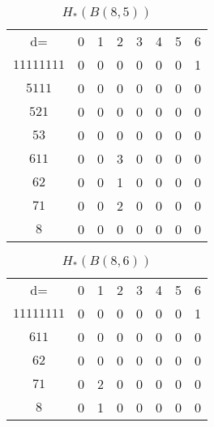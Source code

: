 \documentclass{amsart}
\begin{document}
\begin{table}
\begin{tabular}{cccccccc}
d= & 0 & 1 & 2 & 3 & 4 & 5 & 6  \\
$11111111$ & 0 & 0 & 0 & 0 & 0 & 0 & 1  \\
$5111$     & 0 & 0 & 0 & 0 & 0 & 0 & 0  \\
$521$      & 0 & 0 & 0 & 0 & 0 & 0 & 0  \\
$53$       & 0 & 0 & 0 & 0 & 0 & 0 & 0  \\
$611$      & 0 & 0 & 3 & 0 & 0 & 0 & 0  \\
$62$       & 0 & 0 & 1 & 0 & 0 & 0 & 0  \\
$71$       & 0 & 0 & 2 & 0 & 0 & 0 & 0  \\
$8$        & 0 & 0 & 0 & 0 & 0 & 0 & 0  \\
\end{tabular}
\caption[$H_*(B(8,5))$]{$H_*(B(8, 5))$}
\label{T:8_5}
\end{table}

\begin{table}
\begin{tabular}{cccccccc}
d= & 0 & 1 & 2 & 3 & 4 & 5 & 6  \\
$11111111$ & 0 & 0 & 0 & 0 & 0 & 0 & 1  \\
$611$      & 0 & 0 & 0 & 0 & 0 & 0 & 0  \\
$62$       & 0 & 0 & 0 & 0 & 0 & 0 & 0  \\
$71$       & 0 & 2 & 0 & 0 & 0 & 0 & 0  \\
$8$        & 0 & 1 & 0 & 0 & 0 & 0 & 0  \\
\end{tabular}
\caption[$H_*(B(8,6))$]{$H_*(B(8, 6))$}
\label{T:8_6}
\end{table}

  
  
\end{document}

